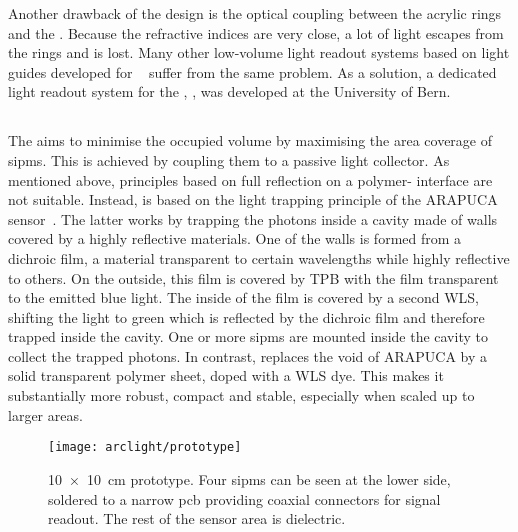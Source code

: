 Another drawback of the design is the optical coupling between the acrylic rings and the \lar{}.
Because the refractive indices are very close, a lot of light escapes from the rings and is lost.
Many other low-volume light readout systems based on light guides developed for \lar{}~\cite{lar_lro1, lar_lro2, lar_lro3, lar_lro4, lar_lro5, lar_lro6, lar_lro7} suffer from the same problem.
As a solution, a dedicated light readout system for the \AC{}, \AL{}, was developed at the University of Bern.


\subsection{}
\label{sec:studies_light-col_al}

The \AL{} aims to minimise the occupied volume by maximising the area coverage of \glspl{sipm}.
This is achieved by coupling them to a passive light collector.
As mentioned above, principles based on full reflection on a polymer-\lar{} interface are not suitable.
Instead, \AL{} is based on the light trapping principle of the ARAPUCA sensor~\cite{arapuca}.
The latter works by trapping the photons inside a cavity made of walls covered by a highly reflective materials.
One of the walls is formed from a dichroic film, a material transparent to certain wavelengths while highly reflective to others.
On the outside, this film is covered by TPB with the film transparent to the emitted blue light.
The inside of the film is covered by a second WLS, shifting the light to green which is reflected by the dichroic film and therefore trapped inside the cavity.
One or more \glspl{sipm} are mounted inside the cavity to collect the trapped photons.
In contrast, \AL{} replaces the void of ARAPUCA by a solid transparent polymer sheet, doped with a WLS dye.
This makes it substantially more robust, compact and stable, especially when scaled up to larger areas.

\begin{figure}[htb]
	\centering
	\texttt{[image: arclight/prototype]}
	\caption{\SI{10 x 10}{\centi\metre} \AL{} prototype.
		Four \glspl{sipm} can be seen at the lower side, soldered to a narrow \gls{pcb} providing coaxial connectors for signal readout.
		The rest of the sensor area is dielectric.}
	\label{fig:arclight_prototype}
\end{figure}

